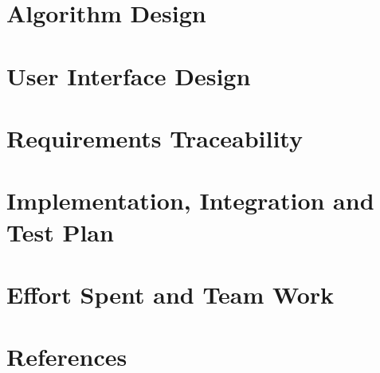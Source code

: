 	\clearpage
	\section{Algorithm Design}
	\label{sect:algorithmDesign}
	
	
	\clearpage
	\section{User Interface Design}
	\label{sect:userInterfaceDesign}
	
	
	\clearpage
	\section{Requirements Traceability}
	\label{sect:traceability}
	
	
	\clearpage
	\section{Implementation, Integration and Test Plan}
	\label{sect:i&tPlan}
	
	
	\clearpage
	\section{Effort Spent and Team Work}
	\label{sect:effort&team}
	
	
	\clearpage
	\section{References}
	\label{sect:references}
	
	
	

